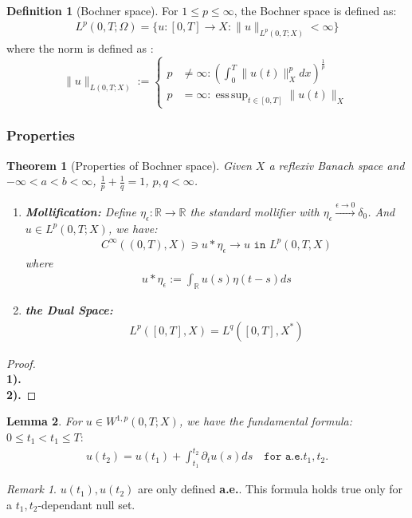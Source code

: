 \documentclass[a4paper,11pt,oneside,fleqn]{book}
\newtheorem{theorem}{Theorem}[section]
\newtheorem{lemma}[theorem]{Lemma}
\theoremstyle{definition}
\newtheorem{definition}{Definition}[section]
\theoremstyle{remark}
\newtheorem*{remark}{Remark}
\DeclareMathOperator*{\esssup}{ess\, sup}
\begin{document}
\begin{definition}[Bochner space]
For $1 \leq p \leq \infty$, the Bochner space is defined as:
\begin{align*}
	L^p(0, T; \Omega) = \{ u: [0, T]\rightarrow X : \|u\|_{L^p(0, T;X)} < \infty \}
\end{align*}
where the norm is defined as :
\begin{equation}
\|u\|_{L(0, T;X)}:=
\left\{
\begin{aligned}
	p &\neq \infty: (\int_0^T \|u(t)\|_X^p dx)^\frac{1}{p}\\
	p &= \infty : \esssup_{t \in [0, T]} \|u(t)\|_X
\end{aligned}
\right.	
\end{equation}
\end{definition}


\subsubsection{Properties}
\begin{theorem}[Properties of Bochner space]
	Given $X$ a reflexiv Banach space and $-\infty < a < b < \infty$, $\frac{1}{p} + \frac{1}{q} = 1$, $p, q < \infty$. 
	\begin{enumerate}
		\item \textbf{Mollification:} Define $\eta_\epsilon: \mathbb{R} \rightarrow \mathbb{R}$ the standard mollifier with $\eta_\epsilon \overset{\epsilon \rightarrow 0}{\rightarrow} \delta_0$. And $u \in L^p(0, T; X)$, we have:
		\begin{align*}
			C^\infty((0, T), X) \ni u * \eta_\epsilon \longrightarrow u \texttt{ in } L^p(0, T, X)
		\end{align*}
		where
		\begin{align*}
			u* \eta_\epsilon := \int_\mathbb{R} u(s) \eta( t - s ) ds
		\end{align*}
		\item \textbf{the Dual Space:}
		\begin{align*}
			L^p([0, T], X) = L^q([0, T], X^*)
		\end{align*}
	\end{enumerate}
\end{theorem}
\begin{proof}
	\quad\\
	\textbf{1).}\\
	\textbf{2).} 
\end{proof}

\begin{lemma}
	For $u \in W^{1, p}(0, T; X)$, we have the fundamental formula: $ 0\le t_1 < t_1 \le T:$
	\begin{align*}
		u(t_2) = u(t_1) + \int_{t_1}^{t_2} \partial_t u(s) ds\quad \texttt{for a.e.}t_1, t_2. 
	\end{align*}
\end{lemma}
\begin{remark}
$u(t_1), u(t_2)$ are only defined \textbf{a.e.}.	 This formula holds true only for a $t_1, t_2$-dependant null set.
\end{remark}
\end{document}
